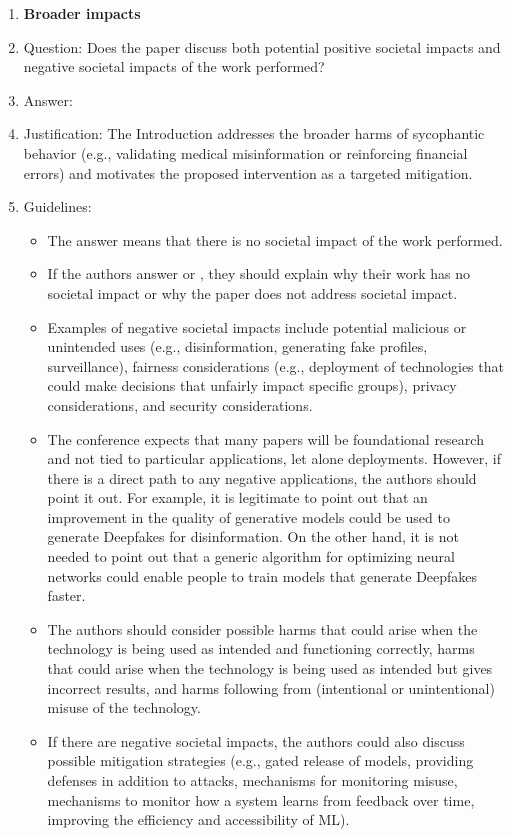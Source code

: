 \documentclass{article}
\begin{document}
\begin{enumerate}
\item {\bf Broader impacts}
    \item[] Question: Does the paper discuss both potential positive societal impacts and negative societal impacts of the work performed?
    \item[] Answer: \answerYes{}
    \item[] Justification: The Introduction addresses the broader harms of sycophantic behavior (e.g., validating medical misinformation or reinforcing financial errors) and motivates the proposed intervention as a targeted mitigation.
    \item[] Guidelines:
    \begin{itemize}
        \item The answer \answerNA{} means that there is no societal impact of the work performed.
        \item If the authors answer \answerNA{} or \answerNo, they should explain why their work has no societal impact or why the paper does not address societal impact.
        \item Examples of negative societal impacts include potential malicious or unintended uses (e.g., disinformation, generating fake profiles, surveillance), fairness considerations (e.g., deployment of technologies that could make decisions that unfairly impact specific groups), privacy considerations, and security considerations.
        \item The conference expects that many papers will be foundational research and not tied to particular applications, let alone deployments. However, if there is a direct path to any negative applications, the authors should point it out. For example, it is legitimate to point out that an improvement in the quality of generative models could be used to generate Deepfakes for disinformation. On the other hand, it is not needed to point out that a generic algorithm for optimizing neural networks could enable people to train models that generate Deepfakes faster.
        \item The authors should consider possible harms that could arise when the technology is being used as intended and functioning correctly, harms that could arise when the technology is being used as intended but gives incorrect results, and harms following from (intentional or unintentional) misuse of the technology.
        \item If there are negative societal impacts, the authors could also discuss possible mitigation strategies (e.g., gated release of models, providing defenses in addition to attacks, mechanisms for monitoring misuse, mechanisms to monitor how a system learns from feedback over time, improving the efficiency and accessibility of ML).
    \end{itemize}
    

\end{enumerate}
\end{document}
